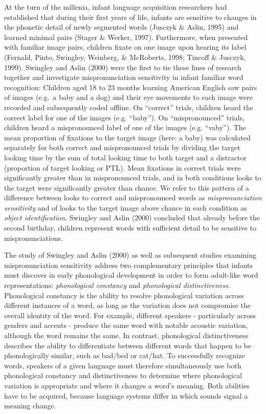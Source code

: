 \documentclass[man]{apa6}
\theoremstyle{definition}
\theoremstyle{definition}
\theoremstyle{definition}
\theoremstyle{remark}
\begin{document}
At the turn of the millenia, infant language acquisition researchers had
established that during their first years of life, infants are sensitive
to changes in the phonetic detail of newly segmented words (Jusczyk \&
Aslin, 1995) and learned minimal pairs (Stager \& Werker, 1997).
Furthermore, when presented with familiar image pairs, children fixate
on one image upon hearing its label (Fernald, Pinto, Swingley, Weinberg,
\& McRoberts, 1998; Tincoff \& Jusczyk, 1999). Swingley and Aslin (2000)
were the first to tie these lines of research together and investigate
mispronunciation sensitivity in infant familiar word recognition:
Children aged 18 to 23 months learning American English saw pairs of
images (e.g.~a baby and a dog) and their eye movements to each image
were recorded and subsequently coded offline. On \enquote{correct}
trials, children heard the correct label for one of the images (e.g.
\enquote{baby}). On \enquote{mispronounced} trials, children heard a
mispronounced label of one of the images (e.g. \enquote{vaby}). The mean
proportion of fixations to the target image (here: a baby) was
calculated separately for both correct and mispronounced trials by
dividing the target looking time by the sum of total looking time to
both target and a distractor (proportion of target looking or PTL). Mean
fixations in correct trials were significantly greater than in
mispronounced trials, and in both conditions looks to the target were
significantly greater than chance. We refer to this pattern of a
difference between looks to correct and mispronounced words as
\emph{mispronunciation sensitivity} and of looks to the target image
above chance in each condition as \emph{object identification}. Swingley
and Aslin (2000) concluded that already before the second birthday,
children represent words with sufficient detail to be sensitive to
mispronunciations.

The study of Swingley and Aslin (2000) as well as subsequent studies
examining mispronunciation sensitivity address two complementary
principles that infants must discover in early phonological development
in order to form adult-like word representations: \emph{phonological
constancy} and \emph{phonological distinctiveness}. Phonological
constancy is the ability to resolve phonological variation across
different instances of a word, as long as the variation does not
compromise the overall identity of the word. For example, different
speakers - particularly across genders and accents - produce the same
word with notable acoustic variation, although the word remains the
same. In contrast, phonological distinctiveness describes the ability to
differentiate between different words that happen to be phonologically
similar, such as bad/bed or cat/hat. To successfully recognize words,
speakers of a given language must therefore simultaneously use both
phonological constancy and distinctiveness to determine where
phonological variation is appropriate and where it changes a word's
meaning. Both abilities have to be acquired, because language systems
differ in which sounds signal a meaning change.
\end{document}
